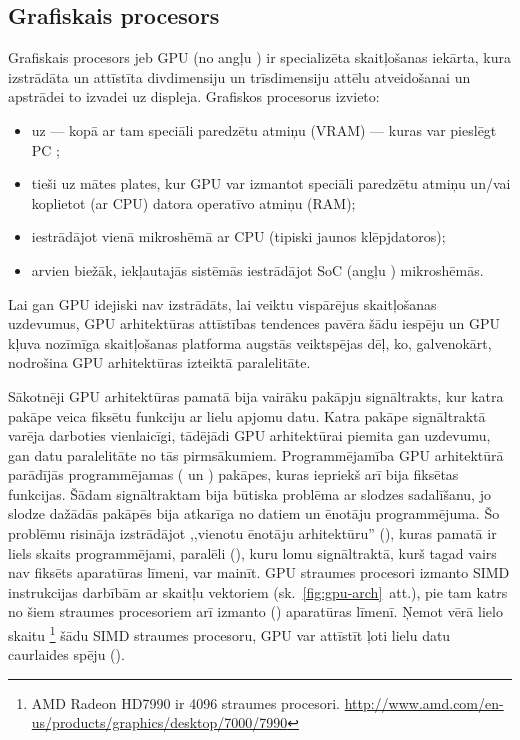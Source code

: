 \subsection{Grafiskais procesors} \label{sec:gpu}
Grafiskais procesors jeb GPU (no angļu )
ir specializēta skaitļošanas iekārta, kura izstrādāta
un attīstīta divdimensiju un trīsdimensiju attēlu atveidošanai un apstrādei
to izvadei uz displeja.
Grafiskos procesorus izvieto:
\begin{itemize}
	\item uz  --- kopā ar tam speciāli paredzētu
		atmiņu (VRAM) --- kuras var pieslēgt PC ;
	\item tieši uz mātes plates, kur GPU var izmantot speciāli paredzētu
		atmiņu un/vai koplietot (ar CPU) datora operatīvo atmiņu (RAM);
	\item iestrādājot vienā mikroshēmā ar CPU (tipiski jaunos klēpjdatoros);
	\item arvien biežāk, iekļautajās sistēmās iestrādājot SoC
		(angļu ) mikroshēmās.
\end{itemize}

Lai gan GPU idejiski nav izstrādāts, lai veiktu vispārējus skaitļošanas
uzdevumus, GPU arhitektūras attīstības tendences pavēra šādu iespēju un GPU
kļuva nozīmīga skaitļošanas platforma augstās veiktspējas dēļ, ko,
galvenokārt, nodrošina GPU arhitektūras izteiktā paralelitāte.

Sākotnēji GPU arhitektūras pamatā bija vairāku pakāpju signāltrakts, kur
katra pakāpe veica fiksētu funkciju ar lielu apjomu datu. Katra pakāpe
signāltraktā varēja darboties vienlaicīgi, tādējādi GPU arhitektūrai
piemita gan uzdevumu, gan datu paralelitāte no tās pirmsākumiem.
Programmējamība GPU arhitektūrā parādījās programmējamas 
( un ) pakāpes,
kuras iepriekš arī bija fiksētas funkcijas. Šādam signāltraktam bija būtiska
problēma ar slodzes sadalīšanu, jo slodze dažādās pakāpēs bija atkarīga
no datiem un ēnotāju programmējuma. Šo problēmu risināja izstrādājot
,,vienotu ēnotāju arhitektūru'' (),
kuras pamatā ir liels skaits programmējami, paralēli
 (), kuru lomu
signāltraktā, kurš tagad vairs nav fiksēts aparatūras līmeni, var mainīt.
GPU straumes procesori izmanto SIMD instrukcijas darbībām ar skaitļu
vektoriem (sk.~\ref{fig:gpu-arch}~att.), pie tam katrs no šiem straumes procesoriem
arī izmanto  () aparatūras
līmenī. Ņemot vērā lielo skaitu%
\footnote{AMD Radeon HD7990 ir 4096 straumes procesori.
	\url{http://www.amd.com/en-us/products/graphics/desktop/7000/7990}}
šādu SIMD straumes procesoru, GPU var attīstīt ļoti lielu datu caurlaides spēju
().
\cite{Fatahalian}\cite{Owens-GPU}

